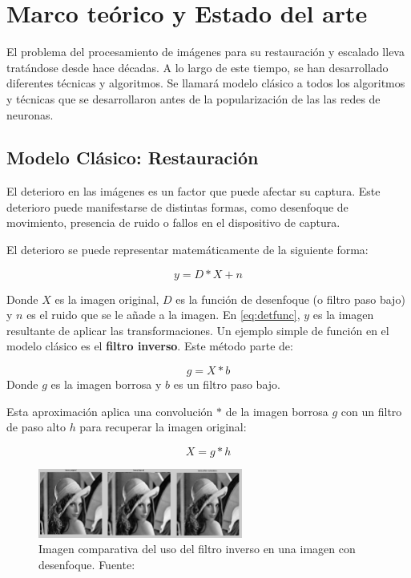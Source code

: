 \chapter{Marco teórico y Estado del arte}
\label{ch:estado del arte}

\quad El problema del procesamiento de imágenes para su restauración y escalado lleva tratándose desde hace décadas. A lo largo de este tiempo, se han desarrollado diferentes técnicas y algoritmos. Se llamará modelo clásico a todos los algoritmos y técnicas que se desarrollaron antes de la popularización de las las redes de neuronas.

\section{Modelo Clásico: Restauración}

\quad El deterioro en las imágenes es un factor que puede afectar su captura. Este deterioro puede manifestarse de distintas formas, como desenfoque de movimiento, presencia de ruido o fallos en el dispositivo de captura\cite{OWLNet}.

El deterioro se puede representar matemáticamente de la siguiente forma\cite{Wavelet}:

\begin{equation}
	y = D*X + n \label{eq:detfunc}
\end{equation}

Donde $X$ es la imagen original, $D$ es la función de desenfoque (o filtro paso bajo) y $n$ es el ruido que se le añade a la imagen. En \eqref{eq:detfunc}, $y$ es la imagen resultante de aplicar las transformaciones.
Un ejemplo simple de función en el modelo clásico es el \textbf{filtro inverso}. Este método parte de: 
	
\begin{equation}
	g = X*b \label{eq:convfilterfunc}
\end{equation}
Donde $g$ es la imagen borrosa y $b$ es un filtro paso bajo.

Esta aproximación aplica una convolución $*$ de la imagen borrosa $g$ con un filtro de paso alto $h$ para recuperar la imagen original:
	
\begin{equation}
	X = g*h \label{eq:invfilterfunc}
\end{equation}

\begin{figure}[H]
	\centering
	\includegraphics[width=0.6\textwidth]{figures/lenna_inverse_dir_blur.png}
	\caption{\label{fig:lenna_inverse_dir_blur}Imagen comparativa del uso del filtro inverso en una imagen con desenfoque. Fuente: \cite{OWLNet_inverse}}
\end{figure}
	
